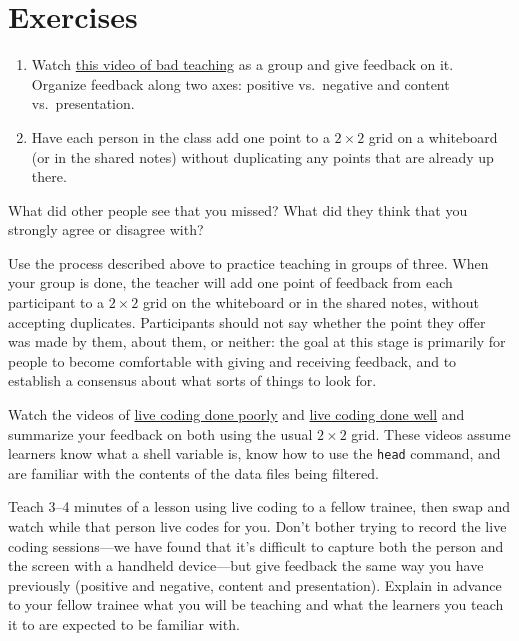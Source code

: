 \section{Exercises}\label{s:performance-exercises}


\begin{enumerate}

\item
  Watch \href{https://www.youtube.com/watch?v=-ApVt04rB4U}{this video
    of bad teaching} as a group and give feedback on it. Organize
  feedback along two axes: positive vs.\ negative and content
  vs.\ presentation.

\item
  Have each person in the class add one point to a $2{\times}2$ grid
  on a whiteboard (or in the shared notes) without duplicating any
  points that are already up there.

\end{enumerate}

What did other people see that you missed? What did they think that you
strongly agree or disagree with?


Use the process described above to practice teaching in groups of
three.  When your group is done, the teacher will add one point of
feedback from each participant to a $2{\times}2$ grid on the
whiteboard or in the shared notes, without accepting duplicates.
Participants should not say whether the point they offer was made by
them, about them, or neither: the goal at this stage is primarily for
people to become comfortable with giving and receiving feedback, and
to establish a consensus about what sorts of things to look for.


Watch the videos of \href{https://youtu.be/bXxBeNkKmJE}{live coding
  done poorly} and \href{https://youtu.be/SkPmwe_WjeY}{live coding
  done well} and summarize your feedback on both using the usual
$2{\times}2$ grid.  These videos assume learners know what a shell
variable is, know how to use the \texttt{head} command, and are
familiar with the contents of the data files being filtered.


Teach 3--4 minutes of a lesson using live coding to a fellow trainee,
then swap and watch while that person live codes for you. Don't bother
trying to record the live coding sessions---we have found that it's
difficult to capture both the person and the screen with a handheld
device---but give feedback the same way you have previously (positive
and negative, content and presentation). Explain in advance to your
fellow trainee what you will be teaching and what the learners you
teach it to are expected to be familiar with.

